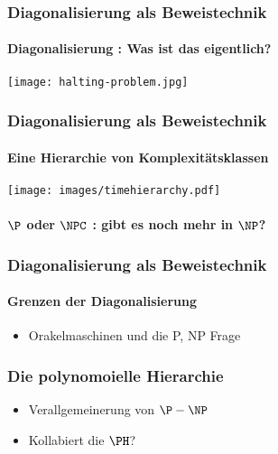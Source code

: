 \begin{frame}
	\frametitle{Diagonalisierung als Beweistechnik}
	\framesubtitle{Diagonalisierung : Was ist das eigentlich?}
	
	\texttt{[image: halting-problem.jpg]}
\end{frame}
\begin{frame}
	\frametitle{Diagonalisierung als Beweistechnik}
	\framesubtitle{Eine Hierarchie von Komplexitätsklassen}
	\texttt{[image: images/timehierarchy.pdf]}
\end{frame}
\begin{frame}
	\framesubtitle{$\P$ oder $\NPC$ : gibt es noch mehr in $\NP$?}
\end{frame}
\begin{frame}
	\frametitle{Diagonalisierung als Beweistechnik}
	\framesubtitle{Grenzen der Diagonalisierung}
	
	\begin{itemize}[<+->]
	  \item Orakelmaschinen und die P, NP Frage
	\end{itemize}
\end{frame}
\begin{frame}
	\frametitle{Die polynomoielle Hierarchie}
		\begin{itemize}[<+->]
			\item Verallgemeinerung von $\P-\NP$
			\item Kollabiert die $\PH$?
		\end{itemize}
	\end{frame}
	
	